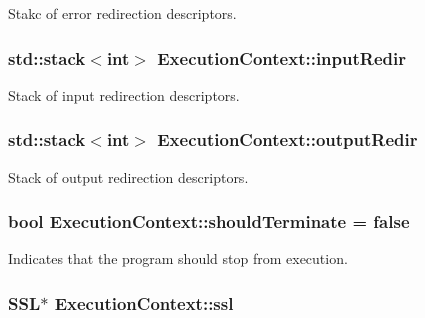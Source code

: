 Stakc of error redirection descriptors. 

\subsubsection[{\texorpdfstring{input\+Redir}{inputRedir}}]{\setlength{\rightskip}{0pt plus 5cm}std\+::stack$<$int$>$ Execution\+Context\+::input\+Redir}\hypertarget{structExecutionContext_a33562118feda5571fe0ba87186670679}{}\label{structExecutionContext_a33562118feda5571fe0ba87186670679}


Stack of input redirection descriptors. 

\subsubsection[{\texorpdfstring{output\+Redir}{outputRedir}}]{\setlength{\rightskip}{0pt plus 5cm}std\+::stack$<$int$>$ Execution\+Context\+::output\+Redir}\hypertarget{structExecutionContext_a15af12d7e8146ae1a5f091b7d9919c8c}{}\label{structExecutionContext_a15af12d7e8146ae1a5f091b7d9919c8c}


Stack of output redirection descriptors. 

\subsubsection[{\texorpdfstring{should\+Terminate}{shouldTerminate}}]{\setlength{\rightskip}{0pt plus 5cm}bool Execution\+Context\+::should\+Terminate = false}\hypertarget{structExecutionContext_a3b3a2c509c6c08190a8ee67e39dd80cf}{}\label{structExecutionContext_a3b3a2c509c6c08190a8ee67e39dd80cf}


Indicates that the program should stop from execution. 

\subsubsection[{\texorpdfstring{ssl}{ssl}}]{\setlength{\rightskip}{0pt plus 5cm}S\+SL$\ast$ Execution\+Context\+::ssl}\hypertarget{structExecutionContext_afce3bfa5f05214b9b0d57ac1edb0a0f4}{}\label{structExecutionContext_afce3bfa5f05214b9b0d57ac1edb0a0f4}
